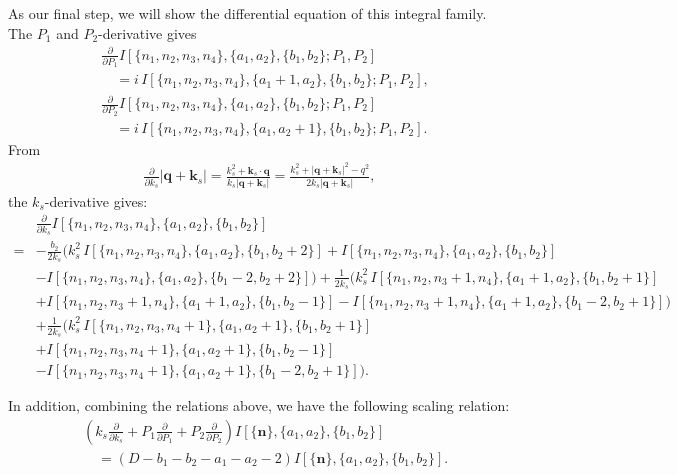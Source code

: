 \documentclass[a4paper]{article}
\newcommand{\n}{\nonumber}
\def\ie{\begin{equation}\begin{aligned}}
\def\fe{\end{aligned}\end{equation}}
\begin{document}
As our final step, we will show the differential equation of this integral family. The $P_1$ and $P_2$-derivative gives
\begin{align}
	&\frac{\partial}{\partial P_1}I[\{n_1,n_2,n_3,n_4\},\{a_1,a_2\},\{b_1,b_2\};P_1,P_2] \nonumber\\
    &\quad= i\,I[\{n_1,n_2,n_3,n_4\},\{a_1+1,a_2\},\{b_1,b_2\};P_1,P_2], \label{eq:GdP1}\\
	&\frac{\partial}{\partial P_2}I[\{n_1,n_2,n_3,n_4\},\{a_1,a_2\},\{b_1,b_2\};P_1,P_2] \nonumber\\
    &\quad= i\,I[\{n_1,n_2,n_3,n_4\},\{a_1,a_2+1\},\{b_1,b_2\};P_1,P_2]. \label{eq:GdP2}
\end{align}
From
\begin{align}
	\frac{\partial}{\partial k_s}|\bm q+\bm k_s|
	=\frac{k_s^2+\bm k_s\cdot \bm q}{k_s|\bm q+\bm k_s|}
	=\frac{k_s^2+|\bm q+\bm k_s|^2-q^2}{2k_s|\bm q+\bm k_s|},
\end{align}
the $k_s$-derivative gives:
\ie
	&\frac{\partial}{\partial k_s}I[\{n_1,n_2,n_3,n_4\},\{a_1,a_2\},\{b_1,b_2\}] \n\\
	=&-\frac{b_2}{2k_s}\Big(
	k_s^2\,I[\{n_1,n_2,n_3,n_4\},\{a_1,a_2\},\{b_1,b_2+2\}]
	+I[\{n_1,n_2,n_3,n_4\},\{a_1,a_2\},\{b_1,b_2\}] \nonumber\\
	&
	-I[\{n_1,n_2,n_3,n_4\},\{a_1,a_2\},\{b_1-2,b_2+2\}]
	\Big)+\frac{1}{2k_s}\Big(
	k_s^2\,I[\{n_1,n_2,n_3+1,n_4\},\{a_1+1,a_2\},\{b_1,b_2+1\}] \nonumber\\
	&
	+I[\{n_1,n_2,n_3+1,n_4\},\{a_1+1,a_2\},\{b_1,b_2-1\}]
	-I[\{n_1,n_2,n_3+1,n_4\},\{a_1+1,a_2\},\{b_1-2,b_2+1\}]
	\Big) \nonumber\\
	&+\frac{1}{2k_s}\Big(
	k_s^2\,I[\{n_1,n_2,n_3,n_4+1\},\{a_1,a_2+1\},\{b_1,b_2+1\}] \nonumber\\
	&+I[\{n_1,n_2,n_3,n_4+1\},\{a_1,a_2+1\},\{b_1,b_2-1\}] \nonumber\\
	&-I[\{n_1,n_2,n_3,n_4+1\},\{a_1,a_2+1\},\{b_1-2,b_2+1\}]
	\Big). \label{eq:Gdks}
\fe

In addition, combining the relations above, we have the following scaling relation:
\begin{align}
	&\left( k_s \frac{\partial}{\partial k_s} + P_1 \frac{\partial}{\partial P_1} + P_2 \frac{\partial}{\partial P_2} \right) I[\{\bm n\},\{a_1,a_2\},\{b_1,b_2\}] \n\\
	&\quad= (D - b_1 - b_2 - a_1 - a_2 - 2) I[\{\bm n\},\{a_1,a_2\},\{b_1,b_2\}]. \label{eq:Gscaling}
\end{align}
\end{document}

